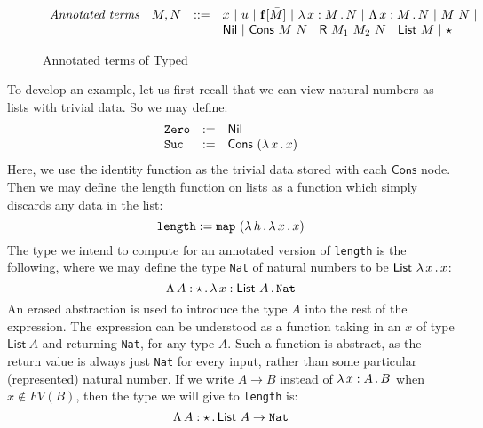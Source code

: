 \documentclass{article}
\begin{document}
\begin{figure}
  \[
  \begin{array}{llll}
    \textit{Annotated terms} & M, N & ::= &
    x\ |\ u\ |\ \mathbf{f}[\bar{M}]\ |\ \tlam{x}{M}{N}\ |\ \Tlam{x}{M}{N}\ |\ M\ N\ |\\
    \ &\ &\ & \mathsf{Nil}\ |\ \mathsf{Cons}\ M\ N\ |\ \mathsf{R}\ M_1\ M_2\ N\ |\ \mathsf{List}\ M\ |\ \star
  \end{array}
  \]
  \caption{Annotated terms of Typed \sar}
  \label{fig:annotm}
\end{figure}

To develop an example, let us first recall that we can view natural numbers as lists with trivial data.  So we may define:
\[
\begin{array}{lll}
  \texttt{Zero} & := & \mathsf{Nil} \\
  \texttt{Suc} & := & \mathsf{Cons}\ (\lambda\, x\, .\, x)
\end{array}
\]
\noindent Here, we use the identity function as the trivial data stored with each $\mathsf{Cons}$ node.  Then
we may define the length function on lists as a function which simply discards any data in the list:
\[
\texttt{length} := \texttt{map}\ (\lam{h}{\lam{x}{x}})
\]
\noindent The type we intend to compute for an annotated version of \texttt{length} is the following,
where we may define the type \texttt{Nat} of natural numbers to be $\mathsf{List}\ \lambda\, x\, .\, x$:
\[
\Tlam{A}{\star}{\tlam{x}{\mathsf{List}\ A}{\texttt{Nat}}}
\]
\noindent An erased abstraction is used to introduce the type $A$ into
the rest of the expression.  The expression can be understood as a
function taking in an $x$ of type $\mathsf{List}\ A$ and returning
\texttt{Nat}, for any type $A$.  Such a function is abstract, as the
return value is always just \texttt{Nat} for every input, rather than
some particular (represented) natural number.  If we write $A \to B$ instead
of $\lambda\, x : A\, .\, B$ when $x\not\in\textit{FV}(B)$, then the type we will
give to \texttt{length}
is:
\[
\Lambda\, A : \star\, .\, \mathsf{List}\ A \to \texttt{Nat}
\]

 
\end{document}
